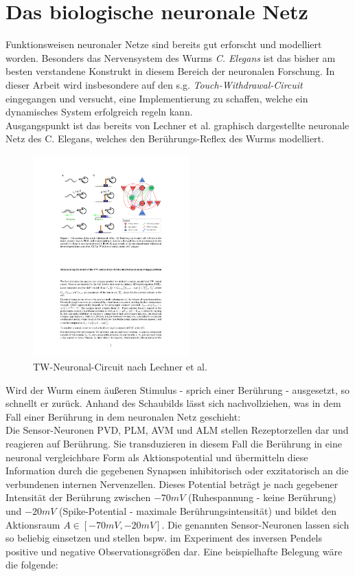 \section{Das biologische neuronale Netz}
\label{sec:neuro_netz}
	Funktionsweisen neuronaler Netze sind bereits gut erforscht und modelliert worden. Besonders das Nervensystem des Wurms \textit{C. Elegans} \cite{CElegans} ist das bisher am besten verstandene Konstrukt in diesem Bereich der neuronalen Forschung. In dieser Arbeit wird insbesondere auf den s.g. \textit{Touch-Withdrawal-Circuit} eingegangen und versucht, eine Implementierung zu schaffen, welche ein dynamisches System erfolgreich regeln kann.\\
	Ausgangspunkt ist das bereits von Lechner et al. \cite{WormLevelRL} graphisch dargestellte neuronale Netz des C. Elegans, welches den Berührungs-Reflex des Wurms modelliert.
	\begin{figure}[!h] %
		\centering
		\includegraphics[width=6cm]{figures/chap_neuron/Orig_TW_Circuit.pdf}
		\caption{TW-Neuronal-Circuit nach Lechner et al. \cite{WormLevelRL}}
		\label{fig:01_TW-Circuit}
	\end{figure}
	Wird der Wurm einem äußeren Stimulus - sprich einer Berührung - ausgesetzt, so schnellt er zurück. Anhand des Schaubilds lässt sich nachvollziehen, was in dem Fall einer Berührung in dem neuronalen Netz geschieht:\\
	Die Sensor-Neuronen PVD, PLM, AVM und ALM stellen Rezeptorzellen dar und reagieren auf Berührung. Sie transduzieren in diesem Fall die Berührung in eine neuronal vergleichbare Form als Aktionspotential und übermitteln diese Information durch die gegebenen Synapsen inhibitorisch oder exzitatorisch an die verbundenen internen Nervenzellen. Dieses Potential beträgt je nach gegebener Intensität der Berührung zwischen $-70mV$ (Ruhespannung - keine Berührung) und $-20mV$ (Spike-Potential - maximale Berührungsintensität) und bildet den Aktionsraum $A\in[-70mV, -20mV]$. Die genannten Sensor-Neuronen lassen sich so beliebig einsetzen und stellen bspw. im Experiment des inversen Pendels positive und negative Observationsgrößen dar. Eine beispielhafte Belegung wäre die folgende:
